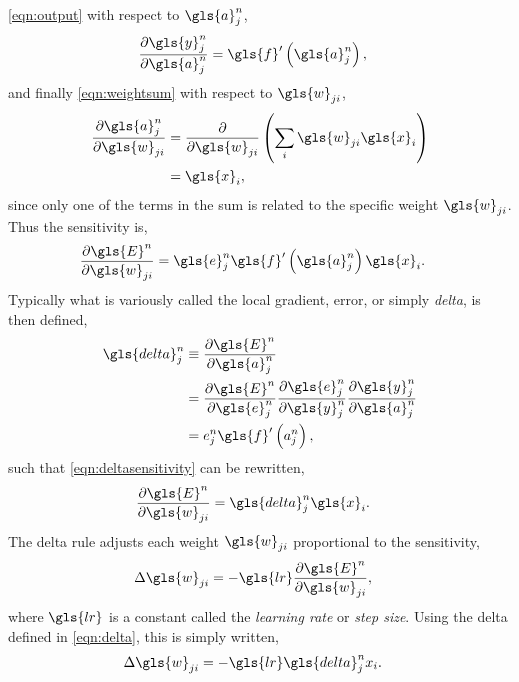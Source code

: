 \documentclass[thesis]{subfiles}
\begin{document}
%
\cref{eqn:output} with respect to $\gls{a}^n_j$,
\begin{equation}
\begin{aligned}
   \frac{\partial \gls{y}^n_j}{\partial \gls{a}^n_j}  &= \gls{f}'\left( \gls{a}^n_j \right),
\end{aligned}
\label{eqn:partialdyda}
\end{equation}
%
and finally \cref{eqn:weightsum} with respect to $\gls{w}_{ji}$,
\begin{equation}
\begin{aligned}
   \frac{\partial \gls{a}^n_j}{\partial \gls{w}_{ji}} &= \frac{\partial}{\partial \gls{w}_{ji}} \left( \sum_i \gls{w}_{ji} \gls{x}_{i} \right)\\
   &= \gls{x}_i,
\end{aligned}
\label{eqn:sumonetermpartial}
\end{equation}
since only one of the terms in the sum is related to the specific weight $\gls{w}_{ji}$. Thus the sensitivity is,
\begin{equation}
\label{eqn:deltasensitivity}
\begin{aligned}
    \frac{\partial \gls{E}^n}{\partial \gls{w}_{ji}} &= \gls{e}^n_j  \gls{f}'\left( \gls{a}^n_j \right) \gls{x}_i.
\end{aligned}
\end{equation}
%
Typically what is variously called the local gradient, error, or simply \emph{delta}, is then defined,
\begin{equation}
\label{eqn:delta}
\begin{aligned}
    \gls{delta}^n_j &\equiv \frac{\partial \gls{E}^n}{\partial \gls{a}^n_j}\\
    &= \frac{\partial \gls{E}^n}{\partial \gls{e}^n_j}\frac{\partial \gls{e}^n_j}{\partial \gls{y}^n_j} \frac{\partial \gls{y}^n_j}{\partial \gls{a}^n_j}\\
    &= e^n_j  \gls{f}'\left( a^n_j \right),
\end{aligned}
\end{equation}
%
such that \cref{eqn:deltasensitivity} can be rewritten,
\begin{equation}
\begin{aligned}
    \frac{\partial \gls{E}^n}{\partial \gls{w}_{ji}} &= \gls{delta}^n_j \gls{x}_i.
\end{aligned}
\end{equation}
%
The delta rule adjusts each weight $\gls{w}_{ji}$ proportional to the sensitivity, 
\begin{equation}
\begin{aligned}
    \Delta \gls{w}_{ji} &= -\gls{lr} \frac{\partial \gls{E}^n}{\partial \gls{w}_{ji}},
\end{aligned}
\end{equation}
%
where $\gls{lr}$ is a constant called the \emph{learning rate} or \emph{step size}. Using the delta defined in \cref{eqn:delta}, this is simply written,
\begin{equation}
\begin{aligned}
    \Delta \gls{w}_{ji} &= -\gls{lr} \gls{delta}^n_j x_i.
\end{aligned}
\end{equation}
%
\end{document}
